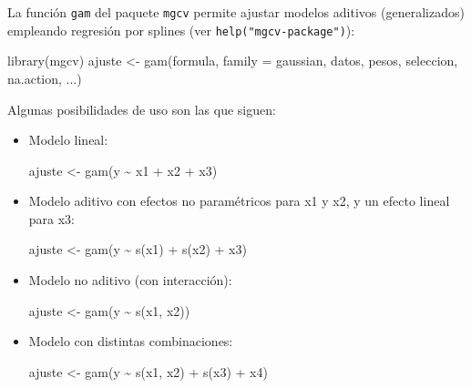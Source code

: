 \documentclass[
]{book}
\newenvironment{Shaded}{\begin{snugshade}}{\end{snugshade}}
\newcommand{\AttributeTok}[1]{\textcolor[rgb]{0.77,0.63,0.00}{#1}}
\newcommand{\FunctionTok}[1]{\textcolor[rgb]{0.00,0.00,0.00}{#1}}
\newcommand{\NormalTok}[1]{#1}
\newcommand{\OtherTok}[1]{\textcolor[rgb]{0.56,0.35,0.01}{#1}}
\newcommand{\SpecialCharTok}[1]{\textcolor[rgb]{0.00,0.00,0.00}{#1}}
\theoremstyle{break}
\theoremstyle{nonumberplain}
\begin{document}
La función \texttt{gam} del paquete \texttt{mgcv} permite ajustar modelos aditivos (generalizados) empleando regresión por splines (ver \texttt{help("mgcv-package")}):

\begin{Shaded}
\begin{Highlighting}[]
\FunctionTok{library}\NormalTok{(mgcv)}
\NormalTok{ajuste }\OtherTok{\textless{}{-}} \FunctionTok{gam}\NormalTok{(formula, }\AttributeTok{family =}\NormalTok{ gaussian, datos, pesos, seleccion, na.action, ...)}
\end{Highlighting}
\end{Shaded}

Algunas posibilidades de uso son las que siguen:

\begin{itemize}
\item
  Modelo lineal:

\begin{Shaded}
\begin{Highlighting}[]
\NormalTok{ajuste }\OtherTok{\textless{}{-}} \FunctionTok{gam}\NormalTok{(y }\SpecialCharTok{\textasciitilde{}}\NormalTok{ x1 }\SpecialCharTok{+}\NormalTok{ x2 }\SpecialCharTok{+}\NormalTok{ x3)}
\end{Highlighting}
\end{Shaded}
\item
  Modelo aditivo con efectos no paramétricos para x1 y x2, y un efecto lineal para x3:

\begin{Shaded}
\begin{Highlighting}[]
\NormalTok{ajuste }\OtherTok{\textless{}{-}} \FunctionTok{gam}\NormalTok{(y }\SpecialCharTok{\textasciitilde{}} \FunctionTok{s}\NormalTok{(x1) }\SpecialCharTok{+} \FunctionTok{s}\NormalTok{(x2) }\SpecialCharTok{+}\NormalTok{ x3)}
\end{Highlighting}
\end{Shaded}
\item
  Modelo no aditivo (con interacción):

\begin{Shaded}
\begin{Highlighting}[]
\NormalTok{ajuste }\OtherTok{\textless{}{-}} \FunctionTok{gam}\NormalTok{(y }\SpecialCharTok{\textasciitilde{}} \FunctionTok{s}\NormalTok{(x1, x2))}
\end{Highlighting}
\end{Shaded}
\item
  Modelo con distintas combinaciones:

\begin{Shaded}
\begin{Highlighting}[]
\NormalTok{ajuste }\OtherTok{\textless{}{-}} \FunctionTok{gam}\NormalTok{(y }\SpecialCharTok{\textasciitilde{}} \FunctionTok{s}\NormalTok{(x1, x2) }\SpecialCharTok{+} \FunctionTok{s}\NormalTok{(x3) }\SpecialCharTok{+}\NormalTok{ x4)}
\end{Highlighting}
\end{Shaded}
\end{itemize}
\end{document}
